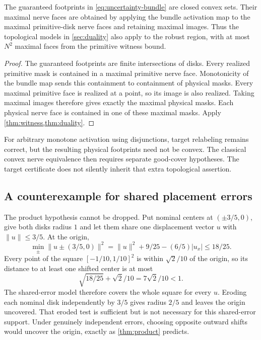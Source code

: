 \begin{proposition}\label{prop:bundle-nerve}
The guaranteed footprints in \cref{eq:uncertainty-bundle} are closed convex sets. Their maximal nerve faces are obtained by applying the bundle activation map to the maximal primitive-disk nerve faces and retaining maximal images. Thus the topological models in \cref{sec:duality} also apply to the robust region, with at most $N^2$ maximal faces from the primitive witness bound.
\end{proposition}
\begin{proof}
The guaranteed footprints are finite intersections of disks. Every realized primitive mask is contained in a maximal primitive nerve face. Monotonicity of the bundle map sends this containment to containment of physical masks. Every maximal primitive face is realized at a point, so its image is also realized. Taking maximal images therefore gives exactly the maximal physical masks. Each physical nerve face is contained in one of these maximal masks. Apply \cref{thm:witness,thm:duality}.
\end{proof}

For arbitrary monotone activation using disjunctions, target relabeling remains correct, but the resulting physical footprints need not be convex. The classical convex nerve equivalence then requires separate good-cover hypotheses. The target certificate does not silently inherit that extra topological assertion.

\subsection{A counterexample for shared placement errors}
The product hypothesis cannot be dropped. Put nominal centers at $(\pm3/5,0)$, give both disks radius $1$ and let them share one displacement vector $u$ with $\|u\|\le3/5$. At the origin,
\[
\min_{\pm}\|u\pm(3/5,0)\|^2
=\|u\|^2+9/25-(6/5)|u_x|\le18/25.
\]
Every point of the square $[-1/10,1/10]^2$ is within $\sqrt2/10$ of the origin, so its distance to at least one shifted center is at most
\[
\sqrt{18/25}+\sqrt2/10=7\sqrt2/10<1.
\]
The shared-error model therefore covers the whole square for every $u$. Eroding each nominal disk independently by $3/5$ gives radius $2/5$ and leaves the origin uncovered. That eroded test is sufficient but is not necessary for this shared-error support. Under genuinely independent errors, choosing opposite outward shifts would uncover the origin, exactly as \cref{thm:product} predicts.

